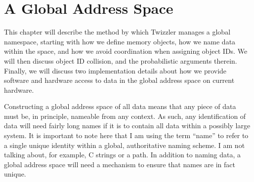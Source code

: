 
\chapter{A Global Address Space}\label{ch:global}


\begin{chabstract}
    This chapter will describe the method by which Twizzler manages a global namespace, starting with how we define
    memory objects, how we name data within the space, and how we avoid coordination when assigning object IDs. We will
    then discuss object ID collision, and the probabilistic arguments therein. Finally, we will discuss two
    implementation details about how we provide software and hardware access to data in the global address space on
    current hardware.
\end{chabstract}

Constructing a global address space of all data means that any piece of data must be, in principle, nameable from any
context. As such, any identification of data will need fairly long names if it is to contain all data within a possibly
large system. It is important to note here that I am using the term ``name'' to refer to a single unique identity
within a global, authoritative naming scheme. I am not talking about, for example, C strings or a
path. In addition to naming data, a global address space will need a mechanism to ensure that names are in fact unique.

